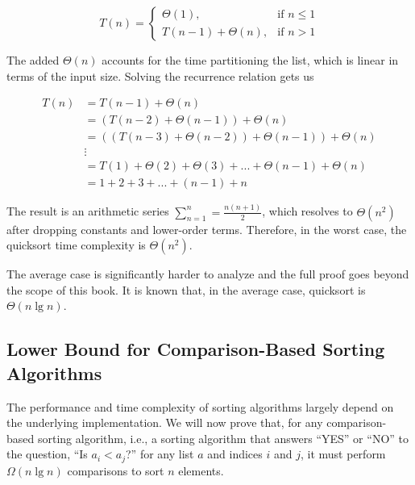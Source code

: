\straightbraces
\[
T(n)=
  \begin{cases}
    \Theta(1), & \text{if } n \leq 1\\
    T(n - 1) + \Theta(n), & \text{if } n > 1
  \end{cases}
\]

The added $\Theta(n)$ accounts for the time partitioning the list, which is linear in terms of the input size. Solving the recurrence relation gets us

\begin{align*}
T(n) &= T(n - 1) + \Theta(n)\\
     &= (T(n - 2) + \Theta(n - 1)) + \Theta(n)\\
     &= ((T(n - 3) + \Theta(n - 2)) + \Theta(n - 1)) + \Theta(n)\\
     &\vdots\\
     &= T(1) + \Theta(2) + \Theta(3) + ... + \Theta(n - 1) + \Theta(n)\\
     &= 1 + 2 + 3 + ... + (n - 1) + n
\end{align*}

The result is an arithmetic series $\sum_{n=1}^{n}=\frac{n(n+1)}{2}$, which resolves to $\Theta(n^2)$ after dropping constants and lower-order terms. Therefore, in the worst case, the quicksort time complexity is $\Theta(n^2)$.

The average case is significantly harder to analyze and the full proof goes beyond the scope of this book. It is known that, in the average case, quicksort is $\Theta(n\lg{n})$. 

\subsection*{Lower Bound for Comparison-Based Sorting Algorithms}
The performance and time complexity of sorting algorithms largely depend on the underlying implementation. We will now prove that, for any comparison-based sorting algorithm, i.e., a sorting algorithm that answers ``YES'' or ``NO'' to the question, ``Is $a_i < a_j$?'' for any list $a$ and indices $i$ and $j$, it must perform $\Omega(n \lg n)$ comparisons to sort $n$ elements.

